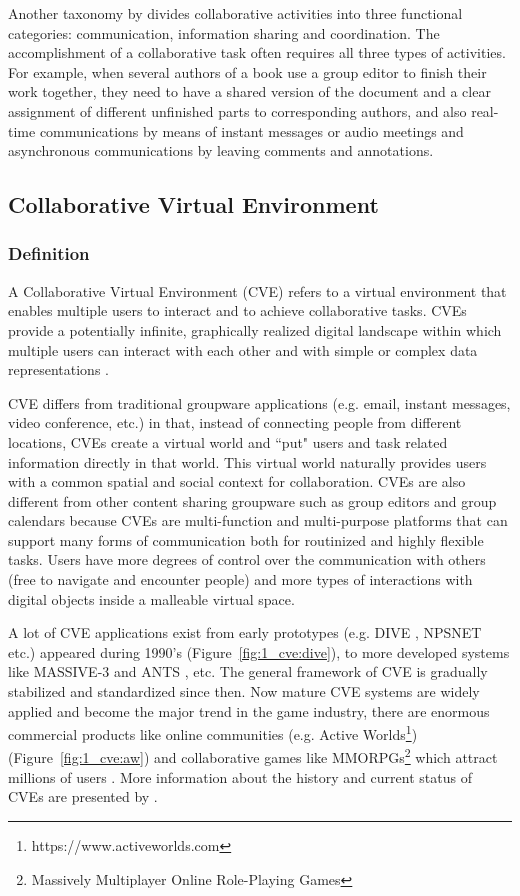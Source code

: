 Another taxonomy by \citep{Grudin2012Taxonomy} divides collaborative activities into three functional categories: communication, information sharing and coordination. The accomplishment of a collaborative task often requires all three types of activities. For example, when several authors of a book use a group editor to finish their work together, they need to have a shared version of the document and a clear assignment of different unfinished parts to corresponding authors, and also real-time communications by means of instant messages or audio meetings and asynchronous communications by leaving comments and annotations.


\subsection{Collaborative Virtual Environment}
\subsubsection{Definition}
A Collaborative Virtual Environment (CVE) refers to a virtual environment that enables multiple users to interact and to achieve collaborative tasks. CVEs provide a potentially infinite, graphically realized digital landscape within which multiple users can interact with each other and with simple or complex data representations \citep{Churchill1998CVE}. 

CVE differs from traditional groupware applications (e.g. email, instant messages, video conference, etc.) in that, instead of connecting people from different locations, CVEs create a virtual world and ``put" users and task related information directly in that world. This virtual world naturally provides users with a common spatial and social context for collaboration. CVEs are also different from other content sharing groupware such as group editors and group calendars because CVEs are multi-function and multi-purpose platforms that can support many forms of communication both for routinized and highly flexible tasks. Users have more degrees of control over the communication with others (free to navigate and encounter people) and more types of interactions with digital objects inside a malleable virtual space.

A lot of CVE applications exist from early prototypes (e.g. DIVE \citep{Carlsson1993DIVE}, NPSNET \citep{Macedonia1994NPSNET} etc.) appeared during 1990's (Figure~\ref{fig:1_cve:dive}), to more developed systems like MASSIVE-3 \citep{Greenhalgh2000MASSIVE} and ANTS \citep{Lopez2003ANTS}, etc. The general framework of CVE is gradually stabilized and standardized since then. Now mature CVE systems are widely applied and become the major trend in the game industry, there are enormous commercial products like online communities (e.g. Active Worlds\footnote{https://www.activeworlds.com}) (Figure~\ref{fig:1_cve:aw}) and collaborative games like MMORPGs\footnote{Massively Multiplayer Online Role-Playing Games} which attract millions of users \citep{Brown2004CSCW}. More information about the history and current status of CVEs are presented by \citet{Joslin2004CVE}.

